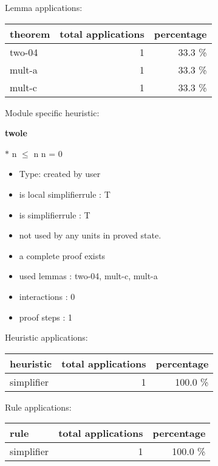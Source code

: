 \documentclass[a4paper]{article}
\begin{document}
Lemma applications:

\begin{supertabular}{l|r|r}
theorem	        & total applications & percentage \\ \hline
two-04 & 1 & 33.3 \% \\
mult-a & 1 & 33.3 \% \\
mult-c & 1 & 33.3 \% \\

\end{supertabular}

Module specific heuristic:

\pagebreak

{\LARGE\bf twole}\label{lemma-twole}

\medskip

  $*$ n $\le$ n \Equiv n = 0

\begin{itemize}

\item Type: created by user

\item is local simplifierrule : T
\item is simplifierrule : T
\item not used by any units in proved state.
\item       a complete proof exists
\item       used lemmas  : two-04, mult-c, mult-a
\item       interactions : 0
\item       proof steps  : 1
\end{itemize}

\medskip


Heuristic applications:

\begin{supertabular}{l|r|r}
heuristic	& total applications & percentage \\ \hline
simplifier & 1 & 100.0 \% \\

\end{supertabular}

Rule applications:

\begin{supertabular}{l|r|r}
rule	        & total applications & percentage \\ \hline
simplifier & 1 & 100.0 \% \\

\end{supertabular}
\end{document}
